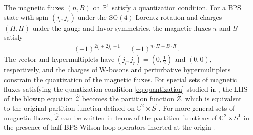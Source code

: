 \documentclass[11pt, a4paper]{article}
\theoremstyle{definition}
\begin{document}
The magnetic fluxes $ (n,B) $ on $ \mathbb{P}^1 $ satisfy a quantization condition. For a BPS state with spin $ (j_l, j_r) $ under the $ \mathrm{SO}(4) $ Lorentz rotation and charges $ (\Pi, H) $ under the gauge and flavor symmetries, the magnetic fluxes $ n $ and $ B $ satisfy \cite{Huang:2017mis, Kim:2020hhh, Closset:2022vjj}
\begin{align}\label{eq:quantization}
    (-1)^{2j_l + 2j_r + 1} = (-1)^{n \cdot \Pi + B \cdot H} \, .
\end{align}
The vector and hypermultiplets have $ (j_l,j_r)=(0,\frac{1}{2}) $ and $ (0,0) $, respectively, and the charges of W-bosons and perturbative hypermultiplets constrain the quantization of the magnetic fluxes. For special sets of magnetic fluxes satisfying the quantization condition \eqref{eq:quantization} studied in \cite{Huang:2017mis, Kim:2019uqw, Kim:2020hhh}, the LHS of the blowup equation $ \hat{\mathcal{Z}} $ becomes the partition function $ \hat{Z} $, which is equivalent to the original partition function defined on $ \mathbb{C}^2 \times S^1 $. For more general sets of magnetic fluxes, $ \hat{\mathcal{Z}} $ can be written in terms of the partition functions of $ \mathbb{C}^2 \times S^1 $ in the presence of half-BPS Wilson loop operators inserted at the origin \cite{Kim:2021gyj, Wang:2023zcb}.
\end{document}
